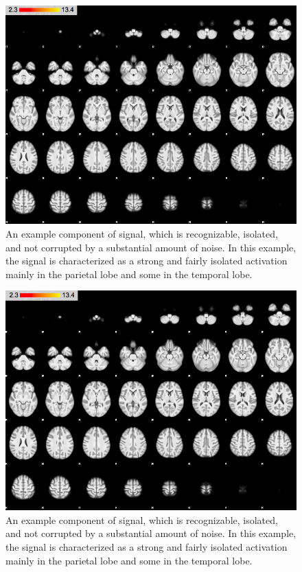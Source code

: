 \begin{figure}[H]                 
	\includegraphics[width=.65\textwidth]{figures/Results/FIX_pos_ID}  
	\caption{An example component of signal, which is recognizable, isolated, and not corrupted by a substantial amount of noise. In this example, the signal is characterized as a strong and fairly isolated activation mainly in the parietal lobe and some in the temporal lobe.}
	\label{FIX_pos_ID} 
\end{figure}

\begin{figure}[H]                 
	\includegraphics[width=.65\textwidth]{figures/Results/FIX_neg_ID}  
	\caption{An example component of signal, which is recognizable, isolated, and not corrupted by a substantial amount of noise. In this example, the signal is characterized as a strong and fairly isolated activation mainly in the parietal lobe and some in the temporal lobe.}
	\label{FIX_neg_ID} 
\end{figure}


















